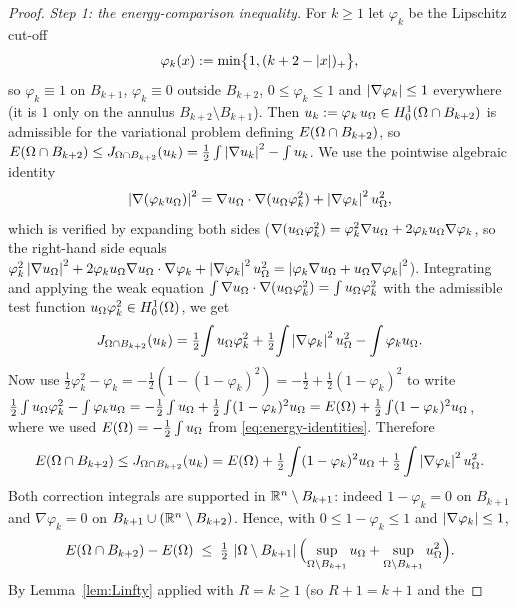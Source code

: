 \begin{proof}
\smallskip
\emph{Step 1: the energy-comparison inequality.}
For $k\ge1$ let $\varphi_k$ be the Lipschitz cut-off
\[
   \varphi_k(x):=\min\bigl\{1,(k+2-\left|x\right|)_+\bigr\},
\]
so $\varphi_k\equiv1$ on $B_{k+1}$, $\varphi_k\equiv0$ outside $B_{k+2}$,
$0\le\varphi_k\le1$ and $\left|\nabla\varphi_k\right|\le1$ everywhere (it is
$1$ only on the annulus $B_{k+2}\setminus B_{k+1}$). Then
$u_k:=\varphi_k\,u_\Omega\in H^1_0(\Omega\cap B_{k+2})$ is admissible for the
variational problem defining $E(\Omega\cap B_{k+2})$, so
$E(\Omega\cap B_{k+2})\le J_{\Omega\cap B_{k+2}}(u_k)
=\tfrac12\int\left|\nabla u_k\right|^2-\int u_k$. We use the pointwise algebraic
identity
\[
   \left|\nabla(\varphi_k u_\Omega)\right|^2
   =\nabla u_\Omega\cdot\nabla(u_\Omega\varphi_k^2)
   +\left|\nabla\varphi_k\right|^2u_\Omega^2,
\]
which is verified by expanding both sides
($\nabla(u_\Omega\varphi_k^2)=\varphi_k^2\nabla u_\Omega
+2\varphi_k u_\Omega\nabla\varphi_k$, so the right-hand side equals
$\varphi_k^2\left|\nabla u_\Omega\right|^2+2\varphi_k u_\Omega\nabla u_\Omega\cdot
\nabla\varphi_k+\left|\nabla\varphi_k\right|^2 u_\Omega^2
=\left|\varphi_k\nabla u_\Omega+u_\Omega\nabla\varphi_k\right|^2$). Integrating and
applying the weak equation
$\int\nabla u_\Omega\cdot\nabla(u_\Omega\varphi_k^2)=\int u_\Omega\varphi_k^2$
with the admissible test function $u_\Omega\varphi_k^2\in H^1_0(\Omega)$, we
get
\[
   J_{\Omega\cap B_{k+2}}(u_k)
   =\tfrac12\!\int u_\Omega\varphi_k^2
   +\tfrac12\!\int\left|\nabla\varphi_k\right|^2u_\Omega^2
   -\int\varphi_k u_\Omega .
\]
Now use $\tfrac12\varphi_k^2-\varphi_k=-\tfrac12(1-(1-\varphi_k)^2)
=-\tfrac12+\tfrac12(1-\varphi_k)^2$ to write
$\tfrac12\int u_\Omega\varphi_k^2-\int\varphi_k u_\Omega
=-\tfrac12\int u_\Omega+\tfrac12\int(1-\varphi_k)^2u_\Omega
=E(\Omega)+\tfrac12\int(1-\varphi_k)^2u_\Omega$, where we used
$E(\Omega)=-\tfrac12\int u_\Omega$ from \eqref{eq:energy-identities}.
Therefore
\begin{equation}\label{eq:energy-exact}
   E(\Omega\cap B_{k+2})\le J_{\Omega\cap B_{k+2}}(u_k)
   =E(\Omega)+\tfrac12\int(1-\varphi_k)^2u_\Omega
          +\tfrac12\int\left|\nabla\varphi_k\right|^2u_\Omega^2 .
\end{equation}
Both correction integrals are supported in $\mathbb R^n\setminus B_{k+1}$:
indeed $1-\varphi_k=0$ on $B_{k+1}$ and $\nabla\varphi_k=0$ on
$B_{k+1}\cup(\mathbb R^n\setminus B_{k+2})$. Hence, with $0\le1-\varphi_k\le1$
and $\left|\nabla\varphi_k\right|\le1$,
\begin{equation}\label{eq:energy-comp-pre}
   E(\Omega\cap B_{k+2})-E(\Omega)
   \;\le\;\tfrac12\,\left|\Omega\setminus B_{k+1}\right|
   \Bigl(\sup_{\Omega\setminus B_{k+1}}u_\Omega
        +\sup_{\Omega\setminus B_{k+1}}u_\Omega^2\Bigr).
\end{equation}
By Lemma~\ref{lem:Linfty} applied with $R=k\ge1$ (so $R+1=k+1$ and the

\end{proof}
